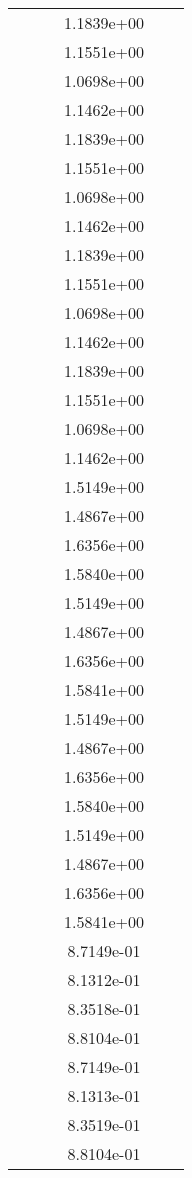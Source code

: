 \begin{xltabular}{\textwidth}{r|rS[table-format=1.3e+2]S[table-format=1.4e+2]S[table-format=1.4e+2]S[table-format=-1.5]}
&  &  & 1.1839e+00 & & \\
&  &  & 1.1551e+00 & & \\
&  &  & 1.0698e+00 & & \\
&  &  & 1.1462e+00 & & \\
&  &  & 1.1839e+00 & & \\
&  &  & 1.1551e+00 & & \\
&  &  & 1.0698e+00 & & \\
&  &  & 1.1462e+00 & & \\
&  &  & 1.1839e+00 & & \\
&  &  & 1.1551e+00 & & \\
&  &  & 1.0698e+00 & & \\
&  &  & 1.1462e+00 & & \\
&  &  & 1.1839e+00 & & \\
&  &  & 1.1551e+00 & & \\
&  &  & 1.0698e+00 & & \\
&  &  & 1.1462e+00 & & \\
&  &  & 1.5149e+00 & & \\
&  &  & 1.4867e+00 & & \\
&  &  & 1.6356e+00 & & \\
&  &  & 1.5840e+00 & & \\
&  &  & 1.5149e+00 & & \\
&  &  & 1.4867e+00 & & \\
&  &  & 1.6356e+00 & & \\
&  &  & 1.5841e+00 & & \\
&  &  & 1.5149e+00 & & \\
&  &  & 1.4867e+00 & & \\
&  &  & 1.6356e+00 & & \\
&  &  & 1.5840e+00 & & \\
&  &  & 1.5149e+00 & & \\
&  &  & 1.4867e+00 & & \\
&  &  & 1.6356e+00 & & \\
&  &  & 1.5841e+00 & & \\
&  &  & 8.7149e-01 & & \\
&  &  & 8.1312e-01 & & \\
&  &  & 8.3518e-01 & & \\
&  &  & 8.8104e-01 & & \\
&  &  & 8.7149e-01 & & \\
&  &  & 8.1313e-01 & & \\
&  &  & 8.3519e-01 & & \\
&  &  & 8.8104e-01 & & \\

\end{xltabular}
